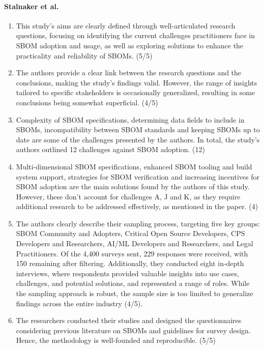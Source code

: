 \paragraph{Stalnaker et al. \cite{article:software-bom}}

\begin{enumerate}
    \item This study's aims are clearly defined through well-articulated research questions, focusing on identifying the current challenges practitioners face in SBOM adoption and usage, as well as exploring solutions to enhance the practicality and reliability of SBOMs. (5/5)
    \item The authors provide a clear link between the research questions and the conclusions, making the study's findings valid. However, the range of insights tailored to specific stakeholders is occasionally generalized, resulting in some conclusions being somewhat superficial. (4/5)
    \item Complexity of SBOM specifications, determining data fields to include in SBOMs, incompatibility between SBOM standards and keeping SBOMs up to date are some of the challenges presented by the authors. In total, the study's authors outlined 12 challenges against SBOM adoption. (12)
    \item Multi-dimensional SBOM specifications, enhanced SBOM tooling and build system support, strategies for SBOM verification and increasing incentives for SBOM adoption are the main solutions found by the authors of this study. However, these don't account for challenges A, J and K, as they require additional research to be addressed effectively, as mentioned in the paper. (4)
    \item The authors clearly describe their sampling process, targeting five key groups: SBOM Community and Adopters, Critical Open Source Developers, CPS Developers and Researchers, AI/ML Developers and Researchers, and Legal Practitioners. Of the 4,400 surveys sent, 229 responses were received, with 150 remaining after filtering. Additionally, they conducted eight in-depth interviews, where respondents provided valuable insights into use cases, challenges, and potential solutions, and represented a range of roles. While the sampling approach is robust, the sample size is too limited to generalize findings across the entire industry (4/5).
    \item The researchers conducted their studies and designed the questionnaires considering previous literature on SBOMs and guidelines for survey design. Hence, the methodology is well-founded and reproducible. (5/5)
\end{enumerate}

